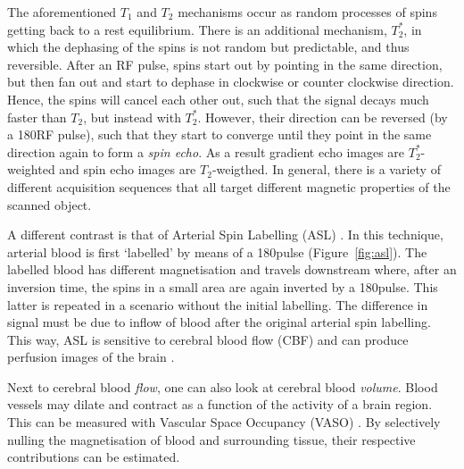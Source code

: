 The aforementioned $T_1$ and $T_2$ mechanisms occur as random processes of spins getting back to a rest equilibrium. There is an additional mechanism, $T_2^*$, in which the dephasing of the spins is not random but predictable, and thus reversible. After an RF pulse, spins start out by pointing in the same direction, but then fan out and start to dephase in clockwise or counter clockwise direction. Hence, the spins will cancel each other out, such that the signal decays much faster than $T_2$, but instead with $T_2^*$. However, their direction can be reversed (by a 180\textdegree RF pulse), such that they start to converge until they point in the same direction again to form a \emph{spin echo}. As a result gradient echo images are $T_2^*$-weighted and spin echo images are $T_2$-weigthed. In general, there is a variety of different acquisition sequences that all target different magnetic properties of the scanned object.

A different contrast is that of Arterial Spin Labelling (ASL) \cite{Williams1992,Detre1994}. In this technique, arterial blood is first `labelled' by means of a 180\textdegree pulse (Figure~\ref{fig:asl}). The labelled blood has different magnetisation and travels downstream where, after an inversion time, the spins in a small area are again inverted by a 180\textdegree pulse. This latter is repeated in a scenario without the initial labelling. The difference in signal must be due to inflow of blood after the original arterial spin labelling. This way, ASL is sensitive to cerebral blood flow (CBF) and can produce perfusion images of the brain \cite{Petcharunpaisan2010}.


Next to cerebral blood \emph{flow}, one can also look at cerebral blood \emph{volume}. Blood vessels may dilate and contract as a function of the activity of a brain region. This can be measured with Vascular Space Occupancy (VASO) \cite{Lu2003}. By selectively nulling the magnetisation of blood and surrounding tissue, their respective contributions can be estimated.

